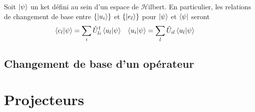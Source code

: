 \documentclass[../notesdecours.tex]{subfiles}
\begin{document}
\begin{Property}
	Soit $\ket{\psi}$ un ket défini au sein d'un espace de $\mathcal{H}$ilbert. En particulier, les relations de changement de base entre $\left\{\ket{u_i}\right\}$ et $\left\{\ket{e_l}\right\}$ pour $\ket{\psi}$ et $\bra{\psi}$ seront
	\begin{align}
		\braket{e_l|\psi} &= \sum_i \hat{U}^\dagger_{li} \braket{u_l|\psi} & \braket{u_i|\psi} &= \sum_l \hat{U}_{il} \braket{u_l|\psi} 
	\end{align}
\end{Property}

\subsection{Changement de base d'un opérateur}

\section{Projecteurs}
\end{document}
